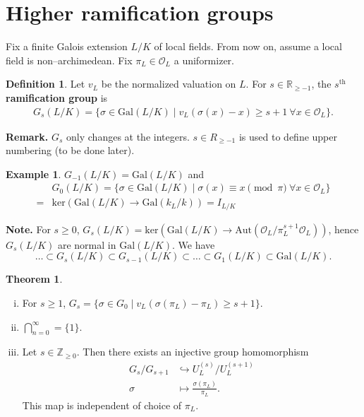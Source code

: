 \documentclass{article}
\theoremstyle{definition}
\newtheorem{theorem}{Theorem}[section]
\newtheorem{example}{Example}[section]
\newtheorem{defn}{Definition}[section]
\begin{document}
\section{Higher ramification groups}
Fix a finite Galois extension $L/K$ of local fields. From now on, assume a local field is non--archimedean. Fix $\pi_L \in \mathcal{O}_L$ a uniformizer.
\begin{defn}
    Let $v_L$ be the normalized valuation on $L$. For $s \in \mathbb{R}_{\ge -1}$, the $s^{\text{th}}$ \textbf{ramification group} is 
    \begin{align*}
        G_s(L/K) = \{\sigma \in \text{Gal}(L/K) \mid v_L(\sigma(x)-x)\ge s+1 ~\forall x \in \mathcal{O}_L\}.
    \end{align*}
\end{defn}
\textbf{Remark.} $G_s$ only changes at the integers. $s \in R_{\ge -1}$ is used to define upper numbering (to be done later).
\begin{example}
    $G_{-1}(L/K) = \text{Gal}(L/K)$ and 
    \begin{align*}
        &G_0(L/K) = \{\sigma \in \text{Gal}(L/K) \mid \sigma(x) \equiv x \pmod{\pi} ~\forall x \in \mathcal{O}_L\} \\
        =& \text{ker}(\text{Gal}(L/K) \to \text{Gal}(k_L/k)) = I_{L/K}
    \end{align*}
\end{example}
\textbf{Note.} For $s \geq 0$, $G_s(L/K) = \text{ker}(\text{Gal}(L/K) \to \text{Aut}(\mathcal{O}_L/\pi_L^{s+1}\mathcal{O}_L))$, hence $G_s(L/K)$ are normal in $\text{Gal}(L/K)$. We have $$\ldots \subset G_s(L/K) \subset G_{s-1}(L/K) \subset \ldots \subset G_1(L/K) \subset \text{Gal}(L/K).$$
\begin{theorem}\label{theorem15.1}
    \begin{enumerate}[(i)]
        \item For $s\ge 1$, $G_s = \{\sigma \in G_0 \mid v_L(\sigma(\pi_L)-\pi_L)\ge s+1\}$.
        \item $\bigcap_{n=0}^{\infty} = \{1\}$.
        \item Let $s \in \mathbb{Z}_{\ge 0}$. Then there exists an injective group homomorphism 
        \begin{align*}
            G_s/G_{s+1} &\hookrightarrow U_L^{(s)}/U_L^{(s+1)}\\
            \sigma &\mapsto \frac{\sigma(\pi_L)}{\pi_L}.
        \end{align*}
        This map is independent of choice of $\pi_L$.
    \end{enumerate}
\end{theorem}
\end{document}
